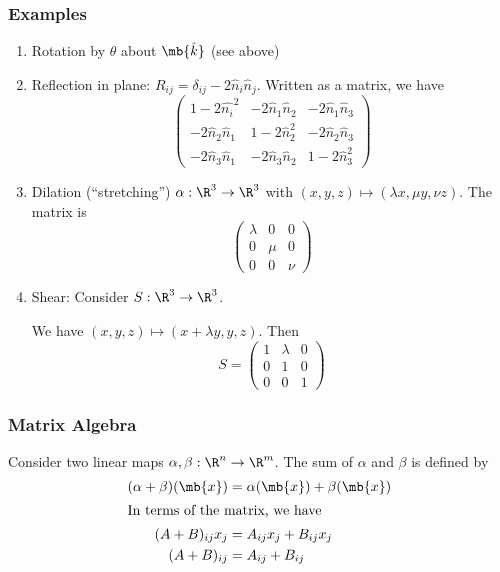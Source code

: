 \documentclass[a4paper]{article}
\begin{document}
\subsubsection{Examples}
\begin{enumerate}
\item Rotation by $\theta$ about $\mb{\hat k}$ (see above)
\item Reflection in plane: $R_{ij} = \delta_{ij} - 2\hat n_i\hat n_j$. Written as a matrix, we have
  \[
  \begin{pmatrix}
    1 - 2\hat{n_i}^2 & -2\hat n_1\hat n_2 & -2\hat n_1\hat n_3\\
    -2\hat n_2\hat n_1 & 1 - 2\hat n_2^2 & -2\hat n_2\hat n_3\\
    -2\hat n_3\hat n_1 & -2\hat n_3\hat n_2 & 1 - 2\hat n_3^2
  \end{pmatrix}
  \]
\item Dilation (``stretching'') $\alpha: \R^3 \to \R^3$ with $(x, y, z)\mapsto (\lambda x, \mu y, \nu z)$. The matrix is
  \[
  \begin{pmatrix}
    \lambda & 0 & 0\\
    0 & \mu & 0\\
    0 & 0 & \nu
  \end{pmatrix}
  \]
\item Shear: Consider $S:\R^3 \to \R^3$.

\begin{center}
\end{center}

We have $(x, y, z)\mapsto (x + \lambda y, y, z)$. Then
\[
S =
\begin{pmatrix}
  1 & \lambda & 0\\
  0 & 1 & 0\\
  0 & 0 & 1
\end{pmatrix}
\]
\end{enumerate}

\subsubsection{Matrix Algebra}
\begin{defi} Consider two linear maps $\alpha, \beta: \R^n\to \R^m$. The sum of $\alpha$ and $\beta$ is defined by
  \begin{align*}
    (\alpha + \beta)(\mb{x}) &= \alpha(\mb{x}) + \beta(\mb{x})\\
    \intertext{In terms of the matrix, we have}
    (A + B)_{ij}x_j &= A_{ij}x_j + B_{ij}x_j\\
    (A + B)_{ij} &= A_{ij}+B_{ij}
  \end{align*}
\end{defi}
\end{document}
